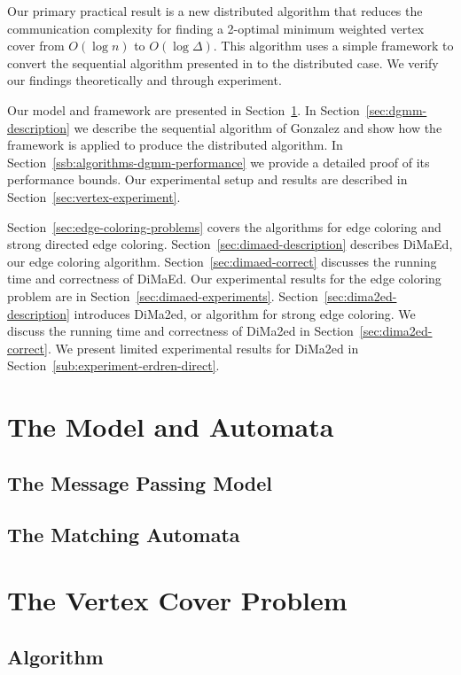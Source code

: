 \documentclass[twoside]{article}
\begin{document}
Our primary practical result is a new distributed algorithm that reduces the communication complexity for finding a 2-optimal minimum weighted vertex cover from $O(\log n)$ to $O(\log \Delta)$. This algorithm uses a simple framework to convert the sequential algorithm presented in \cite{Gonzalez1995129} to the distributed case. We verify our findings theoretically and through experiment.

Our model and framework are presented in Section~\ref{sec:framework}. In Section~\ref{sec:dgmm-description} we describe the sequential algorithm of Gonzalez and show how the framework is applied to produce the distributed algorithm. In Section~\ref{ssb:algorithms-dgmm-performance} we provide a detailed proof of its performance bounds. Our experimental setup and results are described in Section~\ref{sec:vertex-experiment}.

Section~\ref{sec:edge-coloring-problems} covers the algorithms for edge coloring and strong directed edge coloring. Section~\ref{sec:dimaed-description} describes DiMaEd, our edge coloring algorithm. Section~\ref{sec:dimaed-correct} discusses the running time and correctness of DiMaEd. Our experimental results for the edge coloring problem are in Section~\ref{sec:dimaed-experiments}. Section~\ref{sec:dima2ed-description} introduces DiMa2ed, or algorithm for strong edge coloring. We discuss the running time and correctness of DiMa2ed in Section~\ref{sec:dima2ed-correct}. We present limited experimental results for DiMa2ed in Section~\ref{sub:experiment-erdren-direct}.

\section{The Model and Automata}
\label{sec:framework}
\subsection{The Message Passing Model}

\subsection{The Matching Automata}


\section{The Vertex Cover Problem}
\subsection{Algorithm}


\end{document}
